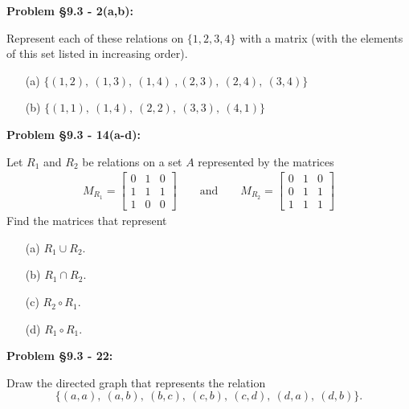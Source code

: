 \documentclass{article}
\newenvironment{problem}[1]
    {\begin{mdframed}[default]
    \textbf{Problem #1:}
    }
    {\end{mdframed}
    }
\begin{document}
\begin{problem}{\S 9.3 - 2(a,b)}
Represent each of these relations on $\{ 1, 2, 3, 4 \}$ with a matrix (with the elements of this set listed in increasing order).
\begin{itemize}
    \item[(a)] $\{ (1,2),~(1,3),~(1,4)~,(2,3),~(2,4),~(3,4) \}$
    \item[(b)] $\{ (1,1),~(1,4),~(2,2),~(3,3),~(4,1) \}$
\end{itemize}
\end{problem}

\begin{problem}{\S 9.3 - 14(a-d)}
Let $R_1$ and $R_2$ be relations on a set $A$ represented by the matrices
\begin{align*}
    M_{R_1} = \begin{bmatrix} 0 & 1 & 0 \\ 1 & 1 & 1 \\ 1 & 0 & 0 \end{bmatrix} \qquad \textrm{and} \qquad
    M_{R_2} = \begin{bmatrix} 0 & 1 & 0 \\ 0 & 1 & 1 \\ 1 & 1 & 1 \end{bmatrix}
\end{align*}
Find the matrices that represent
\begin{itemize}
    \item[(a)] $R_1 \cup R_2$.
    \item[(b)] $R_1 \cap R_2$.
    \item[(c)] $R_2 \circ R_1$.
    \item[(d)] $R_1 \circ R_1$.
\end{itemize}
\end{problem}

\begin{problem}{\S 9.3 - 22}
Draw the directed graph that represents the relation \[ \{ (a,a),~(a,b),~(b,c),~(c,b),~(c,d),~(d,a),~(d,b) \}. \]
\end{problem}
\end{document}
